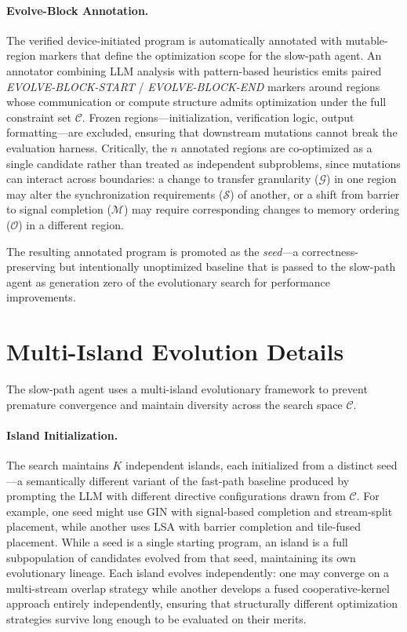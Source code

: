 \paragraph{Evolve-Block Annotation.}
The verified device-initiated program is automatically annotated with mutable-region markers that define the optimization scope for the slow-path agent. An annotator combining LLM analysis with pattern-based heuristics emits paired \emph{EVOLVE-BLOCK-START} / \emph{EVOLVE-BLOCK-END} markers around regions whose communication or compute structure admits optimization under the full constraint set $\mathcal{C}$. Frozen regions---initialization, verification logic, output formatting---are excluded, ensuring that downstream mutations cannot break the evaluation harness. Critically, the $n$ annotated regions are co-optimized as a single candidate rather than treated as independent subproblems, since mutations can interact across boundaries: a change to transfer granularity ($\mathcal{G}$) in one region may alter the synchronization requirements ($\mathcal{S}$) of another, or a shift from barrier to signal completion ($\mathcal{M}$) may require corresponding changes to memory ordering ($\mathcal{O}$) in a different region.

The resulting annotated program is promoted as the \emph{seed}---a correctness-preserving but intentionally unoptimized baseline that is passed to the slow-path agent as generation zero of the evolutionary search for performance improvements.


\section{Multi-Island Evolution Details}\label{sec:multi-island}

The slow-path agent uses a multi-island evolutionary framework to prevent premature convergence and maintain diversity across the search space $\mathcal{C}$.

\paragraph{Island Initialization.}
The search maintains $K$ independent islands, each initialized from a distinct seed---a semantically different variant of the fast-path baseline produced by prompting the LLM with different directive configurations drawn from $\mathcal{C}$. For example, one seed might use GIN with signal-based completion and stream-split placement, while another uses LSA with barrier completion and tile-fused placement. While a seed is a single starting program, an island is a full subpopulation of candidates evolved from that seed, maintaining its own evolutionary lineage. Each island evolves independently: one may converge on a multi-stream overlap strategy while another develops a fused cooperative-kernel approach entirely independently, ensuring that structurally different optimization strategies survive long enough to be evaluated on their merits.

